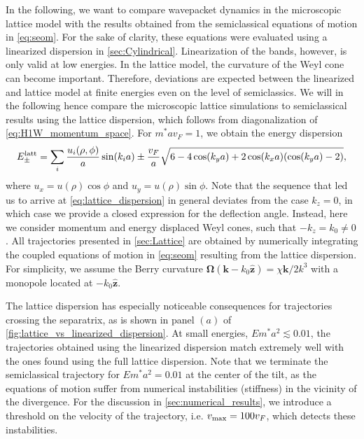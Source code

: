 \documentclass[submission, Phys]{SciPost}
\begin{document}
In the following, we want to compare wavepacket dynamics in the microscopic lattice model with the results obtained from the semiclassical equations of motion in \cref{eq:seom}. For the sake of clarity, these equations were evaluated using a linearized dispersion in \cref{sec:Cylindrical}. Linearization of the bands, however, is only valid at low energies.
In the lattice model, the curvature of the Weyl cone can become important.
Therefore, deviations are expected between the linearized and lattice model at finite energies even on the level of semiclassics. We will in the following hence compare the microscopic lattice simulations to semiclassical results using the lattice dispersion, which follows from diagonalization of \cref{eq:H1W_momentum_space}.
For $m^*av_F=1$, we obtain the energy dispersion
\begin{align}
    E_\pm^{\rm latt}=\sum_i \frac{u_i(\rho,\phi)}{a}\sin(k_i a)\pm \frac{v_F}a\sqrt{6-4\cos(k_y a)+2\cos(k_x a)(\cos(k_y a)-2)},
    \label{eq:lattice_dispersion}
\end{align}
where $u_x = u(\rho) \cos \phi$ and $u_y = u(\rho) \sin \phi$.
Note that the sequence that led us to arrive at \cref{eq:lattice_dispersion} in general deviates from the case $k_z=0$, in which case we provide a closed expression for the deflection angle.
Instead, here we consider momentum and energy displaced Weyl cones, such that $-k_z=k_0\neq0$.
All trajectories presented in \cref{sec:Lattice} are obtained by numerically integrating the coupled equations of motion in \cref{eq:seom} resulting from the lattice dispersion.
For simplicity, we assume the Berry curvature $\bm\Omega(\bm k - k_0\hat{\bm z})=\chi\bm k/2k^3$ with a monopole located at $-k_0\hat{\bm z}$.

The lattice dispersion has especially noticeable consequences for trajectories crossing the separatrix, as is shown in panel $(a)$ of \cref{fig:lattice_vs_linearized_dispersion}.
At small energies, $Em^*a^2\lesssim 0.01$, the trajectories obtained using the linearized dispersion match extremely well with the ones found using the full lattice dispersion.
Note that we terminate the semiclassical trajectory for $Em^*a^2=0.01$ at the center of the tilt, as the equations of motion suffer from numerical instabilities (stiffness) in the vicinity of the divergence.
For the discussion in \cref{sec:numerical_results}, we introduce a threshold on the velocity of the trajectory, i.e. $v_{\rm max}=100 v_F$, which detects these instabilities.
\end{document}
